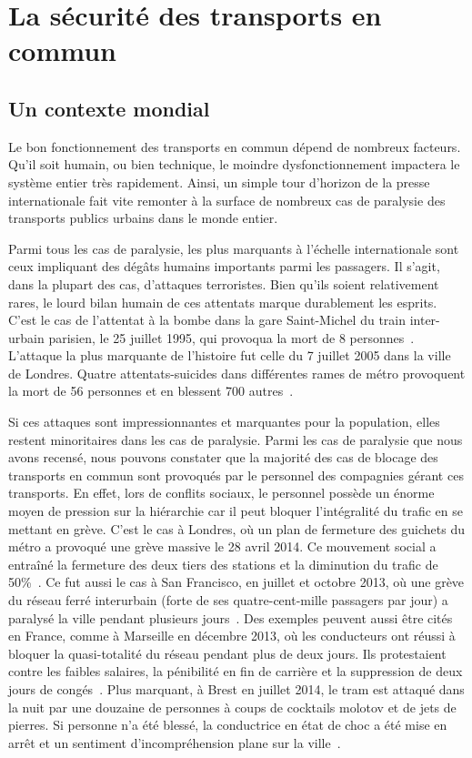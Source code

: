 \section{La sécurité des transports en commun}
    \subsection{Un contexte mondial}
        Le bon fonctionnement des transports en commun dépend de nombreux facteurs. Qu'il soit humain, ou bien technique, le moindre dysfonctionnement impactera le système entier très rapidement. Ainsi, un simple tour d'horizon de la presse internationale fait vite remonter à la surface de nombreux cas de paralysie des transports publics urbains dans le monde entier. 
             
        Parmi tous les cas de paralysie, les plus marquants à l'échelle internationale sont ceux impliquant des dégâts humains importants parmi les passagers. Il s'agit, dans la plupart des cas, d'attaques terroristes. Bien qu'ils soient relativement rares, le lourd bilan humain de ces attentats marque durablement les esprits.  C'est le cas de l'attentat à la bombe dans la gare Saint-Michel du train inter-urbain parisien, le 25 juillet 1995, qui provoqua la mort de 8 personnes~\cite{stmichel}. L'attaque la plus marquante de l'histoire fut celle du 7 juillet 2005 dans la ville de Londres. Quatre attentats-suicides dans différentes rames de métro provoquent la mort de 56 personnes et en blessent 700 autres~\cite{london_attacks}.
        
        Si ces attaques sont impressionnantes et marquantes pour la population, elles restent minoritaires dans les cas de paralysie. Parmi les cas de paralysie que nous avons recensé, nous pouvons constater que la majorité des cas de blocage des transports en commun sont provoqués par le personnel des compagnies gérant ces transports. En effet, lors de conflits sociaux, le personnel possède un énorme moyen de pression sur la hiérarchie car il peut bloquer l'intégralité du trafic en se mettant en grève.  C'est le cas à Londres, où un plan de fermeture des guichets du métro a provoqué une grève massive le 28 avril 2014. Ce mouvement social a entraîné la fermeture des deux tiers des stations et la diminution du trafic de 50\%~\cite{tubeApril}. Ce fut aussi le cas à San Francisco, en juillet et octobre 2013, où une grève du réseau ferré interurbain (forte de ses quatre-cent-mille passagers par jour) a paralysé la ville pendant plusieurs jours~\cite{SFbart}. Des exemples peuvent aussi être cités en France, comme à Marseille en décembre 2013, où les conducteurs ont réussi à bloquer la quasi-totalité du réseau pendant plus de deux jours. Ils protestaient contre les faibles salaires, la pénibilité en fin de carrière et la suppression de deux jours de congés~\cite{greve_marseille}. Plus marquant, à Brest en juillet 2014, le tram est attaqué dans la  nuit par une douzaine de personnes à coups de cocktails molotov et de jets de pierres. Si personne n'a été blessé, la conductrice en état de choc a été mise en arrêt et un sentiment d'incompréhension plane sur la ville~\cite{molotov}.
            
